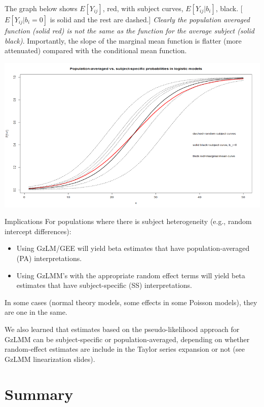\documentclass[
  9pt,
  ignorenonframetext,
]{beamer}
\begin{document}
\begin{frame}{}
\protect\hypertarget{section-16}{}
The graph below shows \(E[Y_{ij}]\), red, with subject curves,
\(E[Y_{ij} |b_i]\), black. {[}\(E[Y_{ij} |b_i=0]\) is solid and the rest
are dashed.{]} \emph{Clearly the population averaged function (solid
red) is not the same as the function for the average subject (solid
black)}. Importantly, the slope of the marginal mean function is flatter
(more attenuated) compared with the conditional mean function.

\begin{center}\includegraphics[width=0.7\linewidth]{figs_L19/f8} \end{center}
\end{frame}

\begin{frame}{Implications}
\protect\hypertarget{implications}{}
For populations where there is subject heterogeneity (e.g., random
intercept differences):

\begin{itemize}
\item
  Using GzLM/GEE will yield beta estimates that have population-averaged
  (PA) interpretations.
\item
  Using GzLMM's with the appropriate random effect terms will yield beta
  estimates that have subject-specific (SS) interpretations.
\end{itemize}

In some cases (normal theory models, some effects in some Poisson
models), they are one in the same.

We also learned that estimates based on the pseudo-likelihood approach
for GzLMM can be subject-specific or population-averaged, depending on
whether random-effect estimates are include in the Taylor series
expansion or not (see GzLMM linearization slides).
\end{frame}

\hypertarget{summary}{%
\section{Summary}\label{summary}}
\end{document}
